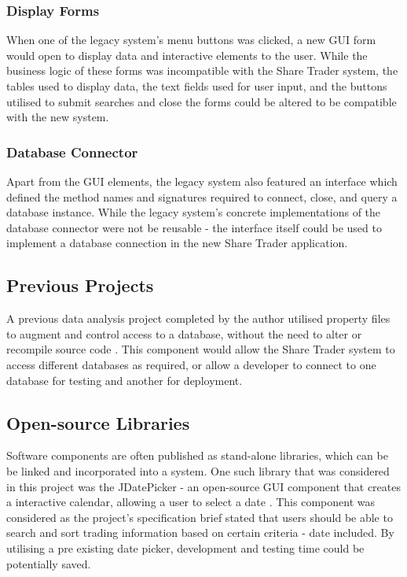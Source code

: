 \documentclass[12pt, a4paper,titlepage]{article}
\begin{document}
\subsubsection{Display Forms}
When one of the legacy system’s menu buttons was clicked, a new GUI form would
open to display data and interactive elements to the user.  
While the business logic of these forms was incompatible with the Share
Trader system, the tables used to display data, the text fields used for user
input, and the buttons utilised to submit searches and close the forms could
be altered to be compatible with the new system.

\subsubsection{Database Connector}
Apart from the GUI elements, the legacy system also featured an interface
which defined the method names and signatures required to connect, close, and
query a database instance.
While the legacy system’s concrete implementations of the database connector
were not be reusable - the interface itself could be used to implement a 
database connection in the new Share Trader application.

\subsection{Previous Projects}
A previous data analysis project completed by the author utilised property
files to augment and control access to a database, without the need to alter
or recompile source code \cite{Dixon2017}.  
This component would allow the Share Trader system
to access different databases as required, or allow a developer to connect to
one database for testing and another for deployment.

\subsection{Open-source Libraries}
Software components are often published as stand-alone libraries, which can be
be linked and incorporated into a system. 
One such library that was considered in this project was the JDatePicker - an
open-source GUI component that creates a interactive calendar, allowing a user
to select a date \cite{Jdate}. 
This component was considered as the project's specification brief stated that
users should be able to search and sort trading information based on certain
criteria - date included. 
By utilising a pre existing date picker, development and testing time could be
potentially saved.
\end{document}
